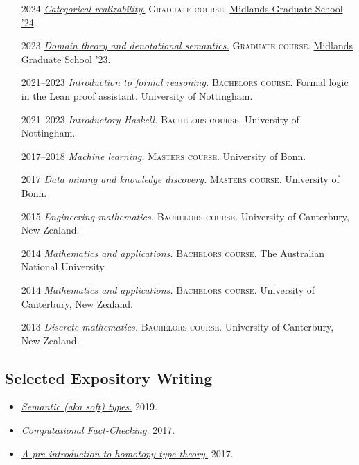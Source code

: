 \documentclass[12pt,a4paper]{article}
\providecommand{\tightlist}{%
  \setlength{\itemsep}{0pt}\setlength{\parskip}{0pt}}
\begin{document}
\begin{itemize}[leftmargin=7ex]
\tightlist
\item[2024]
  \emph{\href{https://github.com/tomdjong/MGS-categorical-realizability}{Categorical realizability.}}
  \textsc{Graduate course.}
  \href{https://www.cs.le.ac.uk/events/mgs2024/}{Midlands Graduate School '24}.
\item[2023]
  \emph{\href{https://github.com/tomdjong/MGS-domain-theory}{Domain theory and denotational semantics.}}
  \textsc{Graduate course.}
  \href{https://www.cs.bham.ac.uk/~mhe/events/MGS23}{Midlands Graduate School '23}.
\item[\small 2021--2023]
  \emph{Introduction to formal reasoning.}
  \textsc{Bachelors course.}
  Formal logic in the Lean proof assistant.
  University of Nottingham.
\item[\small 2021--2023]
  \emph{Introductory Haskell.}
  \textsc{Bachelors course.}
  University of Nottingham.
\item[\small 2017--2018]
  \emph{Machine learning.}
  \textsc{Masters course.}
  University of Bonn.
\item[2017]
  \emph{Data mining and knowledge discovery.}
  \textsc{Masters course.}
  University of Bonn.
\item[2015]
  \emph{Engineering mathematics.}
  \textsc{Bachelors course.}
  University of Canterbury, New Zealand.
\item[2014]
  \emph{Mathematics and applications.}
  \textsc{Bachelors course.}
  The Australian National University.
\item[2014]
  \emph{Mathematics and applications.}
  \textsc{Bachelors course.}
  University of Canterbury, New Zealand.
\item[2013]
  \emph{Discrete mathematics.}
  \textsc{Bachelors course.}
  University of Canterbury, New Zealand.
\end{itemize}

\subsection{Selected Expository Writing}

\begin{itemize}
\tightlist
\item \href{https://joshchen.io/pdf/soft-types-abstract.pdf}{\emph{Semantic (aka soft) types.}} 2019.
\item \href{https://joshchen.io/pdf/computational-fact-checking-report.pdf}{\emph{Computational Fact-Checking.}} 2017.
\item \href{https://joshchen.io/pdf/hott-preintro-notes.pdf}{\emph{A pre-introduction to homotopy type theory.}} 2017.
\end{itemize}
\end{document}
